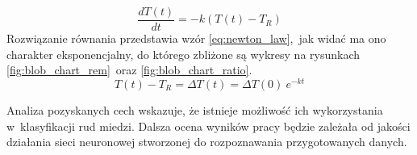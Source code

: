 \begin{equation}
    \frac{dT \left( t \right)}{dt}=-k\left( T \left( t \right) -T_{R} \right)
    \label{eq:newton_law_diff}
\end{equation}
Rozwiązanie równania przedstawia wzór \ref{eq:newton_law},~jak widać ma ono
charakter eksponencjalny, do którego zbliżone są wykresy na rysunkach
\ref{fig:blob_chart_rem}~oraz \ref{fig:blob_chart_ratio}.
\begin{equation}
    T(t) - T_{R} = \Delta T (t) = \Delta T (0) \ e^ {-k t}
    \label{eq:newton_law}
\end{equation}

Analiza pozyskanych cech wskazuje, że istnieje możliwość ich wykorzystania
w~klasyfikacji rud miedzi.
Dalsza ocena wyników pracy będzie zależała od jakości działania sieci neuronowej
stworzonej do rozpoznawania przygotowanych danych.
